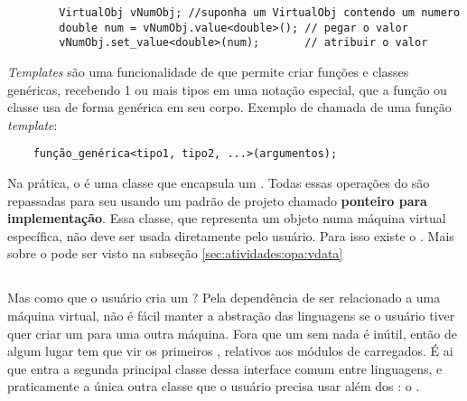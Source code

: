 \begin{itemize}
\begin{lstlisting}
        VirtualObj vNumObj; //suponha um VirtualObj contendo um numero
        double num = vNumObj.value<double>(); // pegar o valor
        vNumObj.set_value<double>(num);       // atribuir o valor
      \end{lstlisting}
  \end{itemize}

  \begin{framed}
    \textit{Templates} são uma funcionalidade de \CXX{} que permite
    criar funções e classes genéricas, recebendo 1 ou mais tipos\footnotemark{} em uma notação especial,
    que a função ou classe usa de forma genérica em seu corpo. Exemplo de chamada de uma
    função \textit{template}:
  \begin{verbatim}
    função_genérica<tipo1, tipo2, ...>(argumentos);\end{verbatim}
  \end{framed}
  
  
  Na prática, o \VObj{} é uma classe que encapsula um \VData{}. Todas essas operações do
  \VObj{} são repassadas para seu \VData{} usando um padrão de projeto chamado
  \textbf{ponteiro para implementação}\footnotemark{}. Essa classe, que representa um objeto numa máquina
  virtual específica, não deve ser usada diretamente pelo usuário. Para isso existe o
  \VObj{}. Mais sobre o \VData{} pode ser visto na subseção \ref{sec:atividades:opa:vdata}
  
  
  \subsection{\SMgr{}}
  \label{sec:atividades:opa:smgr}
  Mas como que o usuário cria um \VObj{}? Pela dependência de ser relacionado a uma máquina virtual,
  não é fácil manter a abstração das linguagens se o usuário tiver quer criar um \VObj{} para uma outra
  máquina. Fora que um \VObj{} sem nada é inútil, então de algum lugar tem que vir os primeiros ,
  relativos aos módulos de \script{} carregados. É ai que entra a segunda principal classe dessa interface 
  comum entre linguagens, e praticamente a única outra classe que o usuário precisa usar além dos :
  o \SMgr{}.
  
